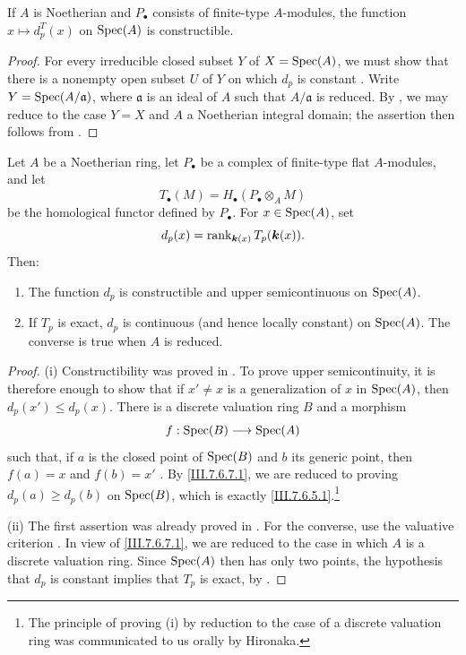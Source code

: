 \begin{lemma}[7.6.8]
\label{III.7.6.8}
If $A$ is Noetherian and $P_\bullet$ consists of finite-type
$A$-modules, the function $x\mapsto d_p^T(x)$ on $\operatorname{Spec}(A)$
is constructible.
\end{lemma}

\begin{proof}
For every irreducible closed subset $Y$ of
$X=\operatorname{Spec}(A)$, we must show that there is a nonempty open
subset $U$ of $Y$ on which $d_p$ is constant
.  Write $Y=\operatorname{Spec}(A/\mathfrak a)$, where
$\mathfrak a$ is an ideal of $A$ such that
$A/\mathfrak a$ is reduced.  By , we may
reduce to the case $Y=X$ and $A$ a Noetherian integral
domain; the assertion then follows from .
\end{proof}

\begin{theorem}[7.6.9]
\label{III.7.6.9}
Let $A$ be a Noetherian ring, let $P_\bullet$ be a complex of
finite-type flat $A$-modules, and let
\[
  T_\bullet(M)=H_\bullet(P_\bullet\otimes_A M)
\]
be the homological functor defined by $P_\bullet$.  For
$x\in\operatorname{Spec}(A)$, set
\[
  d_p(x)=\operatorname{rank}_{\boldsymbol{k}(x)}T_p(\boldsymbol{k}(x)).
\]
Then:
\begin{enumerate}
  \item[(i)] The function $d_p$ is constructible and upper
    semicontinuous on $\operatorname{Spec}(A)$.
  \item[(ii)] If $T_p$ is exact, $d_p$ is continuous (and
    hence locally constant) on $\operatorname{Spec}(A)$.  The converse is
    true when $A$ is reduced.
\end{enumerate}
\end{theorem}

\begin{proof}
\textnormal{(i)}
Constructibility was proved in .  To prove
upper semicontinuity, it is therefore enough
 to show that if $x'\neq x$ is a
generalization of $x$ in $\operatorname{Spec}(A)$, then
$d_p(x')\leq d_p(x)$.  There is a discrete valuation ring
$B$ and a morphism
\[
  f:\operatorname{Spec}(B)\longrightarrow\operatorname{Spec}(A)
\]
such that, if $a$ is the closed point of $\operatorname{Spec}(B)$ and $b$
its generic point, then $f(a)=x$ and $f(b)=x'$
.  By \eqref{III.7.6.7.1}, we are reduced
to proving $d_p(a)\geq d_p(b)$ on $\operatorname{Spec}(B)$, which is exactly
\eqref{III.7.6.5.1}.\footnote{The principle of proving
\textnormal{(i)} by reduction to the case of a discrete
valuation ring was communicated to us orally by Hironaka.}

\medskip
\textnormal{(ii)}
The first assertion was already proved in
.  For the converse, use the valuative
criterion .  In view of
\eqref{III.7.6.7.1}, we are reduced to the case in which $A$
is a discrete valuation ring.  Since $\operatorname{Spec}(A)$ then has only
two points, the hypothesis that $d_p$ is constant implies
that $T_p$ is exact, by .
\end{proof}

